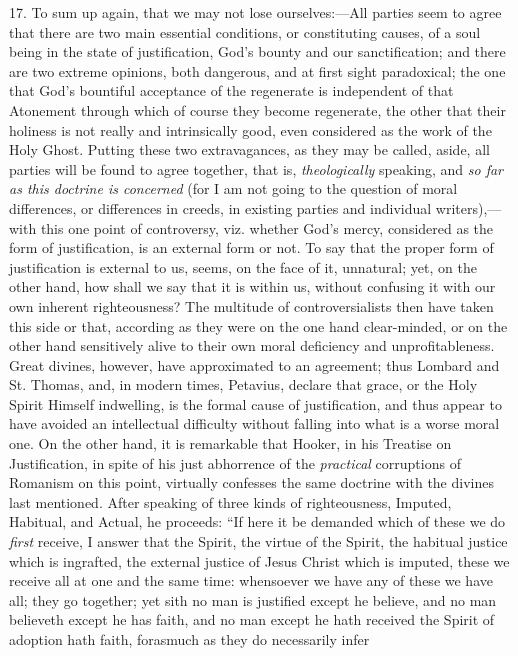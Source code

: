17. To sum up again, that we may not lose ourselves:—All parties
seem to agree that there are two main essential conditions, or
constituting causes, of a soul being in the state of justification,
God's bounty and our sanctification; and there are two extreme
opinions, both dangerous, and at first sight paradoxical; the one that
God's bountiful acceptance of the regenerate is independent of that
Atonement through which of course they become regenerate, the other
that their holiness is not really and intrinsically good, even
considered as the work of the Holy Ghost. Putting these two
extravagances, as they may be called, aside, all parties will be found
to agree together, that is, \emph{theologically} speaking, and \emph{so
far as this doctrine is concerned} (for I am not going to the
question of moral differences, or differences in creeds, in existing
parties and individual writers),—with this one point of controversy,
viz. whether God's mercy, considered as the form of justification, is
an external form or not. To say that the proper form of justification
is external to us, seems, on the face of it, unnatural; yet, on the
other hand, how shall we say that it is within us, without confusing
it with our own inherent righteousness? The multitude of
controversialists then have taken this side or that, according as they
were on the one hand clear-minded, or on the other hand sensitively
alive to their own moral deficiency and unprofitableness. Great
divines, however, have approximated to an agreement; thus Lombard and
St. Thomas, and, in modern times, Petavius, declare that grace,
or the Holy Spirit Himself indwelling, is the formal cause of
justification, and thus appear to have avoided an intellectual
difficulty without falling into what is a worse moral one. On the
other hand, it is remarkable that Hooker, in his Treatise on
Justification, in spite of his just abhorrence of the \emph{practical}
corruptions of Romanism on this point, virtually confesses the same
doctrine with the divines last mentioned. After speaking of three
kinds of righteousness, Imputed, Habitual, and Actual, he proceeds:
``If here it be demanded which of these we do \emph{first}
receive, I answer that the Spirit, the virtue of the Spirit, the
habitual justice which is ingrafted, the external justice of Jesus
Christ which is imputed, these we receive all at one and the same
time: whensoever we have any of these we have all; they go together;
yet sith no man is justified except he believe, and no man believeth
except he has faith, and no man except he hath received the Spirit of
adoption hath faith, forasmuch as they do necessarily infer
